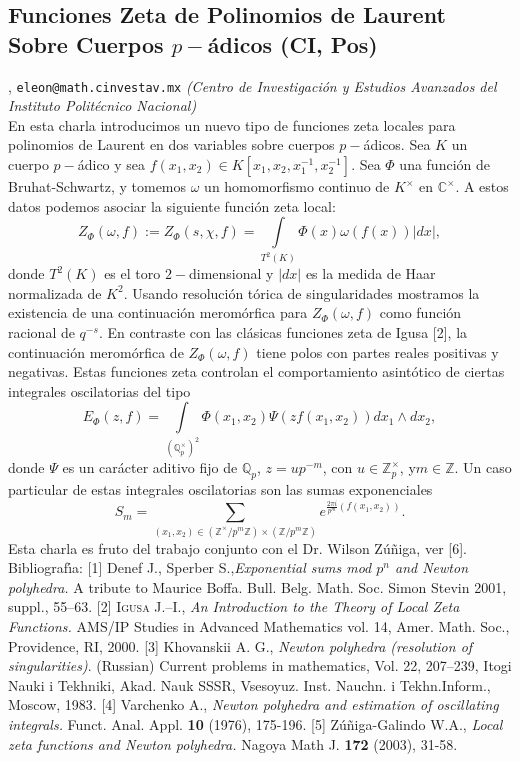 \subsection{\sffamily Funciones Zeta de Polinomios de Laurent Sobre Cuerpos $p-$\'adicos {\footnotesize (CI, Pos)}} \label{reg-489} 
, {\tt eleon@math.cinvestav.mx}  {\slshape (Centro de Investigaci\'on y Estudios Avanzados del Instituto Polit\'ecnico Nacional)}\\
          \noindent En esta charla introducimos un nuevo tipo de funciones zeta locales para polinomios de Laurent en dos variables sobre cuerpos $p-$\'adicos. Sea $K$ un cuerpo $p-$\'adico y sea $f(x_1,x_2)\in K[x_1,x_2,x_1^{-1},x_2^{-1}]$. Sea $\Phi$ una funci\'on de Bruhat-Schwartz, y tomemos $\omega$ un homomorfismo continuo de $K^{\times}$ en $\mathbb{C}^{\times}$. A estos datos podemos asociar la siguiente funci\'on zeta local:\[Z_{\Phi}\left(  \omega,f\right)  :=Z_{\Phi}\left(  s,\chi,f\right)  =\int\limits_{T^{2}\left(  K\right)  }\Phi\left(  x\right)  \omega\left(  f\left(  x\right)  \right)  \left\vert dx\right\vert ,\]donde $T^2(K)$ es el toro $2-$dimensional y $\left\vert dx\right\vert $ es la medida de Haar normalizada de $K^{2}$. Usando resoluci\'on t\'orica de singularidades mostramos la existencia de una continuaci\'on merom\'orfica para $Z_{\Phi}\left(  \omega,f\right)$ como funci\'on racional de $q^{-s}$. En contraste con las cl\'asicas funciones zeta de Igusa [2], la continuaci\'on merom\'orfica de $Z_{\Phi}\left(  \omega,f\right)$ tiene polos con partes reales positivas y negativas. Estas funciones zeta controlan el comportamiento asint\'otico de ciertas integrales oscilatorias del tipo\[E_{\Phi}\left(  z,f\right)  =\int\limits_{\left(  \mathbb{Q}_{p}^{\times}\right)  ^{2}}\Phi\left(  x_1,x_2\right)  \Psi\left(  zf\left(  x_1,x_2\right)  \right)dx_1\wedge dx_2,\]donde $\Psi$ es un car\'acter aditivo fijo de $\mathbb{Q}_{p}$, $z=up^{-m}$, con $u\in\mathbb{Z}_{p}^{\times}$, y$m\in\mathbb{Z}$. Un caso particular de estas integrales oscilatorias son las sumas exponenciales\[S_{m}=\sum\limits_{(x_1,x_2)\in\left(  \mathbb{Z}^{\times}/p^{m}\mathbb{Z}\right) \times\left(  \mathbb{Z}/p^{m}\mathbb{Z}\right)}e^{\frac{2\pi i}{p^m}\left( f(x_1,x_2)\right)}.\]Esta charla es fruto del trabajo conjunto con el Dr. Wilson Z\'u\~niga, ver [6]. Bibliograf\'\i a: [1] {\sc Denef J., Sperber S.},{\it Exponen\-tial sums mod $p^{n}$ and Newton polyhedra.} A tribute to Maurice Boffa. Bull. Belg. Math. Soc. Simon Stevin 2001, suppl., 55--63. [2] \textsc{Igusa J.--I.}, \textit{An Introduction to the Theory of Local Zeta Functions.}  AMS/IP Studies in Advanced Mathematics vol. 14, Amer. Math. Soc., Providence, RI, 2000. [3] {\sc Khovanskii A. G.}, {\it Newton polyhedra (resolution of singularities)}. (Russian) Current problems in mathematics, Vol. 22, 207--239, Itogi Nauki i Tekhniki, Akad. Nauk SSSR, Vsesoyuz. Inst. Nauchn. i Tekhn.Inform., Moscow, 1983. [4] {\sc Varchenko A.}, \textit{Newton polyhedra and estimation of oscillating integrals.} Funct. Anal. Appl. {\bf 10} (1976), 175-196. [5] {\sc Z\'u\~niga-Galindo W.A.}, \textit{Local zeta functions and Newton polyhedra.} Nagoya Math J. {\bf 172} (2003), 31-58. 
